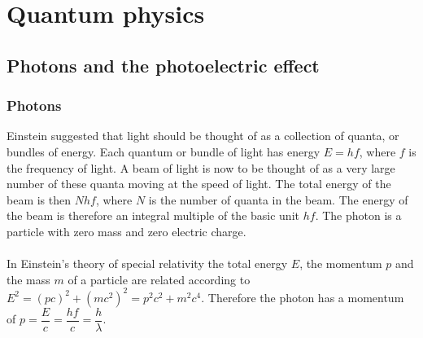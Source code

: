 \documentclass[a4paper,12pt]{article}
\begin{document}
\section{Quantum physics}
\subsection{Photons and the photoelectric effect}
\subsubsection*{Photons}
Einstein suggested that light should be thought of as a collection of quanta, or bundles of energy. Each quantum or bundle of light has energy $E=hf$, where $f$ is the frequency of light. 
A beam of light is now to be thought of as a very large number of these quanta moving at the speed of light. The total energy of the beam is then $Nhf$, where $N$ is the number of quanta in the beam.
The energy of the beam is therefore an integral multiple of the basic unit $hf$. The photon is a particle with zero mass and zero electric charge.\\\\
In Einstein's theory of special relativity the total energy $E$, the momentum $p$ and the mass $m$ of a particle are related according to $E^2=(pc)^2+(mc^2)^2=p^2c^2+m^2c^4$. Therefore the photon has a momentum of $p=\dfrac{E}{c}=\dfrac{hf}{c}=\dfrac{h}{\lambda}$. 
\end{document}
